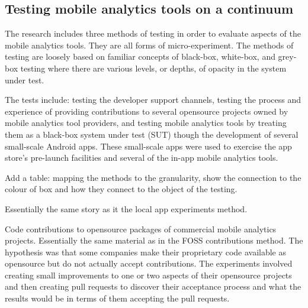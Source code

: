 \subsection{Testing mobile analytics tools on a continuum}


 The research includes three methods of testing in order to evaluate aspects of the mobile analytics tools. 
 They are all forms of micro-experiment. The methods of testing are loosely based on familiar concepts of black-box, white-box, and grey-box testing where there are various levels, or depths, of opacity in the system under test.

The tests include: testing the developer support channels, testing the process and experience of providing contributions to several opensource projects owned by mobile analytics tool providers, and testing mobile analytics tools by treating them as a black-box system under test (SUT) though the development of several small-scale Android apps. These small-scale apps were used to exercise the app store's pre-launch facilities and several of the in-app mobile analytics tools. 

Add a table: mapping the methods to the granularity, show the connection to the colour of box and how they connect to the object of the testing.




Essentially the same story as it the local app experiments method.

Code contributions to opensource packages of commercial mobile analytics projects.
%
Essentially the same material as in the FOSS contributions method. The hypothesis was that some companies make their proprietary code available as opensource but do not actually accept contributions. The experiments involved creating small improvements to one or two aspects of their opensource projects and then creating pull requests to discover their acceptance process and what the results would be in terms of them accepting the pull requests.

